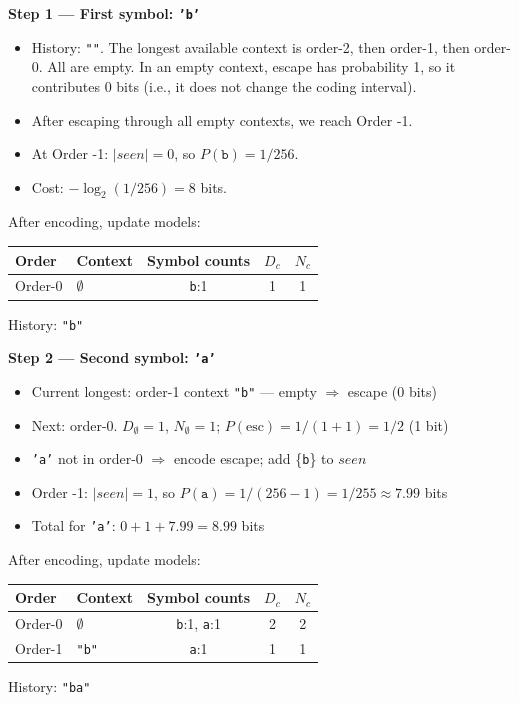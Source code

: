 \begin{examplebox}

\textbf{Step 1 — First symbol: \texttt{'b'}}
\begin{itemize}
    \item History: \texttt{""}. The longest available context is order-2, then order-1, then order-0. All are empty. In an empty context, escape has probability 1, so it contributes 0 bits (i.e., it does not change the coding interval).
    \item After escaping through all empty contexts, we reach Order -1.
    \item At Order -1: $|seen| = 0$, so $P(\texttt{b}) = 1/256$.
    \item Cost: $-\log_2(1/256) = 8$ bits.
\end{itemize}
After encoding, update models:

\begin{center}
\footnotesize
\begin{tabular}{|l|l|c|c|c|}
\hline
\textbf{Order} & \textbf{Context} & \textbf{Symbol counts} & $D_c$ & $N_c$ \\
\hline
Order-0 & $\emptyset$ & \texttt{b}:1 & 1 & 1 \\
\hline
\end{tabular}
\end{center}
History: \texttt{"b"}

\bigskip
\textbf{Step 2 — Second symbol: \texttt{'a'}}
\begin{itemize}
    \item Current longest: order-1 context \texttt{"b"} — empty $\Rightarrow$ escape (0 bits)
    \item Next: order-0. $D_{\emptyset}=1$, $N_{\emptyset}=1$; $P(\text{esc}) = 1/(1+1) = 1/2$ (1 bit)
    \item \texttt{'a'} not in order-0 $\Rightarrow$ encode escape; add \{\texttt{b}\} to $seen$
    \item Order -1: $|seen| = 1$, so $P(\texttt{a}) = 1/(256-1) = 1/255 \approx 7.99$ bits
    \item Total for \texttt{'a'}: $0 + 1 + 7.99 = 8.99$ bits
\end{itemize}
After encoding, update models:

\begin{center}
\footnotesize
\begin{tabular}{|l|l|c|c|c|}
\hline
\textbf{Order} & \textbf{Context} & \textbf{Symbol counts} & $D_c$ & $N_c$ \\
\hline
Order-0 & $\emptyset$ & \texttt{b}:1, \texttt{a}:1 & 2 & 2 \\
Order-1 & \texttt{"b"} & \texttt{a}:1 & 1 & 1 \\
\hline
\end{tabular}
\end{center}
History: \texttt{"ba"}


\end{examplebox}

